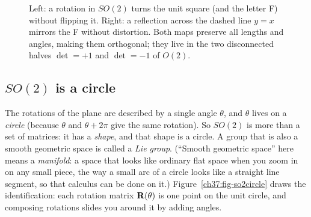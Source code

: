 \begin{figure}[H]
\centering
{}
\caption{Left: a rotation in $SO(2)$ turns the unit square (and the letter F)
without flipping it. Right: a reflection across the dashed line $y=x$ mirrors the F
without distortion. Both maps preserve all lengths and angles, making them orthogonal;
they live in the two disconnected halves $\det=+1$ and $\det=-1$ of $O(2)$.}
\label{ch37:fig-on}
\end{figure}

\subsection{$SO(2)$ is a circle}
\label{ch37:so2}

The rotations of the plane are described
by a single angle $\theta$, and $\theta$ lives on a \emph{circle} (because
$\theta$ and $\theta + 2\pi$ give the same rotation). So $SO(2)$ is more than a set
of matrices: it has a \emph{shape}, and that shape is a circle. A group that is
also a smooth geometric space is called a \emph{Lie group}. (``Smooth geometric
space'' here means a \emph{manifold}: a space that looks like ordinary flat space
when you zoom in on any small piece, the way a small arc of a circle looks like a
straight line segment, so that calculus can be done on it.)
Figure~\ref{ch37:fig-so2circle} draws the identification: each rotation matrix
$\mathbf{R}(\theta)$ is one point on the unit circle, and composing rotations slides
you around it by adding angles.

